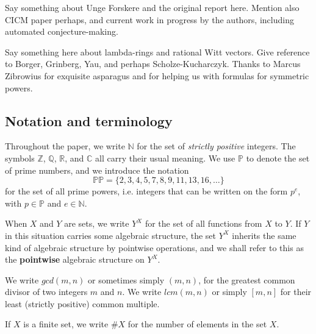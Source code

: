 \documentclass[a4paper]{article}
\theoremstyle{definition}
\theoremstyle{remark}
\newcommand{\defhl}[1]{\textbf{#1}}
\begin{document}
Say something about Unge Forskere and the original report here. Mention also CICM paper perhaps, and current work in progress by the authors, including automated conjecture-making. 

Say something here about lambda-rings and rational Witt vectors. Give reference to Borger, Grinberg, Yau, and perhaps Scholze-Kucharczyk. Thanks to Marcus Zibrowius for exquisite asparagus and for helping us with formulas for symmetric powers.


\subsection{Notation and terminology}

Throughout the paper, we write $\mathbb{N}$ for the set of \emph{strictly positive} integers. The symbols $\mathbb{Z}$, $\mathbb{Q}$, $\mathbb{R}$, and $\mathbb{C}$ all carry their usual meaning. We use $\mathbb{P}$ to denote the set of prime numbers, and we introduce the notation
$$ \mathbb{PP} = \{ 2, 3, 4, 5, 7, 8, 9, 11, 13, 16, \ldots  \}  $$
for the set of all prime powers, i.e. integers that can be written on the form $p^e$, with $p \in \mathbb{P}$ and $e \in \mathbb{N}$.

When $X$ and $Y$ are sets, we write $Y^X$ for the set of all functions from $X$ to $Y$. If $Y$ in this situation carries some algebraic structure, the set $Y^X$ inherits the same kind of algebraic structure by pointwise operations, and we shall refer to this as the \defhl{pointwise} algebraic structure on $Y^X$.

We write $gcd(m, n)$ or sometimes simply $(m, n)$, for the greatest common divisor of two integers $m$ and $n$. We write $lcm(m, n)$ or simply $[m ,n]$ for their least (strictly positive) common multiple.

If $X$ is a finite set, we write $\# X$ for the number of elements in the set $X$. 
\end{document}

